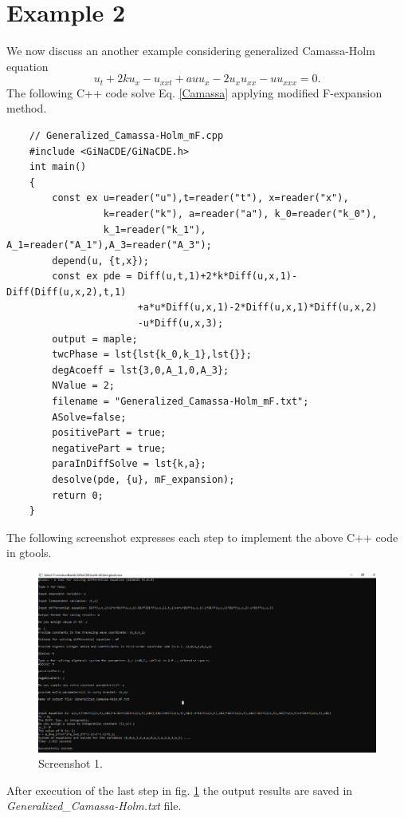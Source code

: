 \documentclass[11pt,a4paper,titlepage]{article}
\begin{document}
\section{Example 2}
We now discuss an another example considering generalized Camassa-Holm equation
\begin{equation}\label{Camassa}
	{u_t} + 2k{u_x} - {u_{xxt}} + au{u_x} - 2{u_x}{u_{xx}} - u{u_{xxx}} = 0.
\end{equation}
The following C++ code solve Eq. \eqref{Camassa} applying modified F-expansion method.
\newline
\begin{verbatim}
	// Generalized_Camassa-Holm_mF.cpp
	#include <GiNaCDE/GiNaCDE.h>
	int main()
	{
	    const ex u=reader("u"),t=reader("t"), x=reader("x"), 
	             k=reader("k"), a=reader("a"), k_0=reader("k_0"), 
	             k_1=reader("k_1"), A_1=reader("A_1"),A_3=reader("A_3");   
	    depend(u, {t,x});
	    const ex pde = Diff(u,t,1)+2*k*Diff(u,x,1)-Diff(Diff(u,x,2),t,1)
	                   +a*u*Diff(u,x,1)-2*Diff(u,x,1)*Diff(u,x,2)
	                   -u*Diff(u,x,3); 
	    output = maple;
	    twcPhase = lst{lst{k_0,k_1},lst{}};
	    degAcoeff = lst{3,0,A_1,0,A_3};
	    NValue = 2;
	    filename = "Generalized_Camassa-Holm_mF.txt";
	    ASolve=false;
	    positivePart = true; 
	    negativePart = true;
	    paraInDiffSolve = lst{k,a};
	    desolve(pde, {u}, mF_expansion);
	    return 0;
	}
\end{verbatim}
The following screenshot expresses each step to implement the above C++ code in gtools.


\begin{figure}[H]
	\centering
	\includegraphics[width=\linewidth]{gtools_ss3}
	\caption{ Screenshot 1. }
	\label{fig:gtools_ss3}
\end{figure}



After execution of the last step in fig. \ref{fig:gtools_ss3} the output results are saved in \emph{Generalized\_Camassa-Holm.txt} file.
\end{document}
